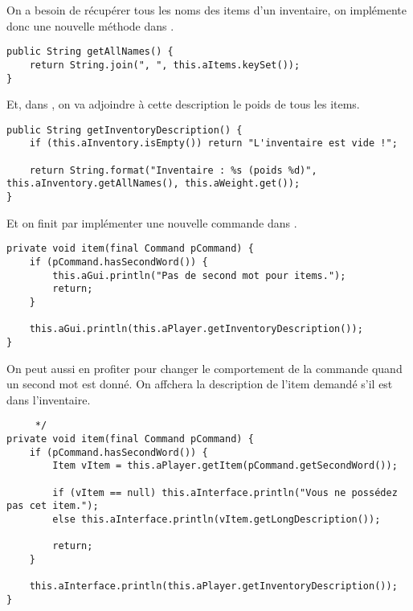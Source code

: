 \begin{exercise}[subtitle=Inventaire]

On a besoin de récupérer tous les noms des items d'un inventaire, on implémente donc une nouvelle méthode dans .

\begin{verbatim}
public String getAllNames() {
    return String.join(", ", this.aItems.keySet());
}
\end{verbatim}

Et, dans , on va adjoindre à cette description le poids de tous les items.

\begin{verbatim}
public String getInventoryDescription() {
    if (this.aInventory.isEmpty()) return "L'inventaire est vide !";

    return String.format("Inventaire : %s (poids %d)", this.aInventory.getAllNames(), this.aWeight.get());
}
\end{verbatim}

Et on finit par implémenter une nouvelle commande  dans .

\begin{verbatim}
private void item(final Command pCommand) {
    if (pCommand.hasSecondWord()) {
        this.aGui.println("Pas de second mot pour items.");
        return;
    }

    this.aGui.println(this.aPlayer.getInventoryDescription());
}
\end{verbatim}

On peut aussi en profiter pour changer le comportement de la commande quand un second mot est donné. On affchera la description de l'item demandé s'il est dans l'inventaire.

\begin{verbatim}
     */
private void item(final Command pCommand) {
    if (pCommand.hasSecondWord()) {
        Item vItem = this.aPlayer.getItem(pCommand.getSecondWord());
        
        if (vItem == null) this.aInterface.println("Vous ne possédez pas cet item.");
        else this.aInterface.println(vItem.getLongDescription());
        
        return;
    }

    this.aInterface.println(this.aPlayer.getInventoryDescription());
}
\end{verbatim}

\end{exercise}

